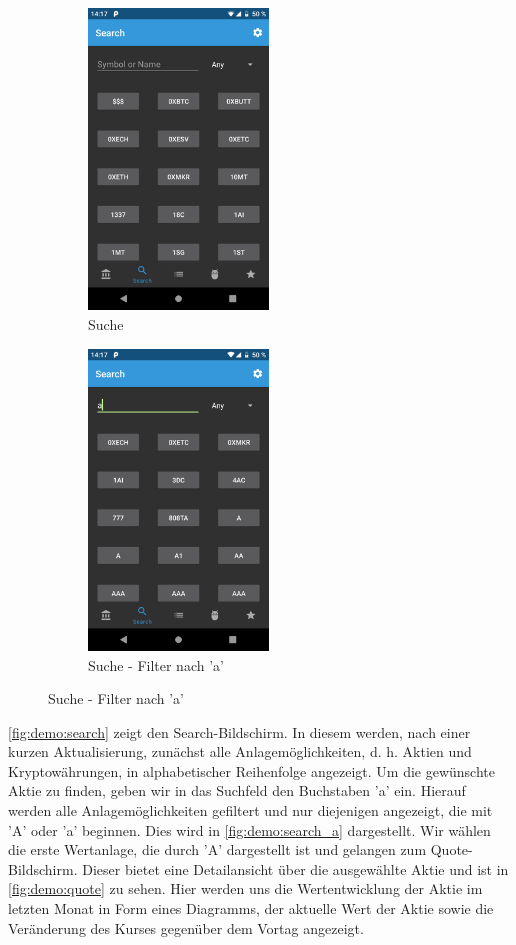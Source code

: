 \documentclass[a4paper]{article}
\begin{document}
\begin{figure}[H]
	\begin{subfigure}{.5\textwidth}
		\centering
		\includegraphics[height=8cm,keepaspectratio]{./images/demo/search.png}
		\caption{Suche}
		\label{fig:demo:search}
	\end{subfigure}
	\begin{subfigure}{.5\textwidth}
		\centering
		\includegraphics[height=8cm,keepaspectratio]{./images/demo/search_a.png}
		\caption{Suche - Filter nach 'a'}
		\label{fig:demo:search_a}
	\end{subfigure}
\end{figure}

\autoref{fig:demo:search} zeigt den Search-Bildschirm. In diesem werden, nach einer kurzen Aktualisierung, zunächst alle Anlagemöglichkeiten, d. h. Aktien und Kryptowährungen, in alphabetischer Reihenfolge angezeigt. Um die gewünschte Aktie zu finden, geben wir in das Suchfeld den Buchstaben 'a' ein. Hierauf werden alle Anlagemöglichkeiten gefiltert und nur diejenigen angezeigt, die mit 'A' oder 'a' beginnen. Dies wird in \autoref{fig:demo:search_a} dargestellt. Wir wählen die erste Wertanlage, die durch 'A' dargestellt ist und gelangen zum Quote-Bildschirm. Dieser bietet eine Detailansicht über die ausgewählte Aktie und ist in \autoref{fig:demo:quote} zu sehen. Hier werden uns die Wertentwicklung der Aktie im letzten Monat in Form eines Diagramms, der aktuelle Wert der Aktie sowie die Veränderung des Kurses gegenüber dem Vortag angezeigt.
\end{document}
